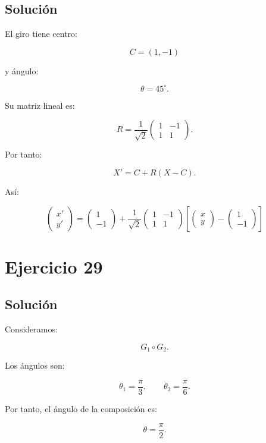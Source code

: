 \documentclass[11pt,a4paper]{article}
\begin{document}
\subsection{Solución}

El giro tiene centro:

\[
C=(1,-1)
\]

y ángulo:

\[
\theta=45^\circ.
\]

Su matriz lineal es:

\[
R=
\frac1{\sqrt2}
\begin{pmatrix}
1&-1\\
1&1
\end{pmatrix}.
\]

Por tanto:

\[
X'=C+R(X-C).
\]

Así:

\[
\boxed{
\begin{pmatrix}
x'\\
y'
\end{pmatrix}
=
\begin{pmatrix}
1\\
-1
\end{pmatrix}
+
\frac1{\sqrt2}
\begin{pmatrix}
1&-1\\
1&1
\end{pmatrix}
\left[
\begin{pmatrix}
x\\
y
\end{pmatrix}
-
\begin{pmatrix}
1\\
-1
\end{pmatrix}
\right]
}
\]

\section{Ejercicio 29}
\subsection{Solución}

Consideramos:

\[
G_1\circ G_2.
\]

Los ángulos son:

\[
\theta_1=\frac{\pi}{3},
\qquad
\theta_2=\frac{\pi}{6}.
\]

Por tanto, el ángulo de la composición es:

\[
\theta
=
\frac{\pi}{2}.
\]
\end{document}
